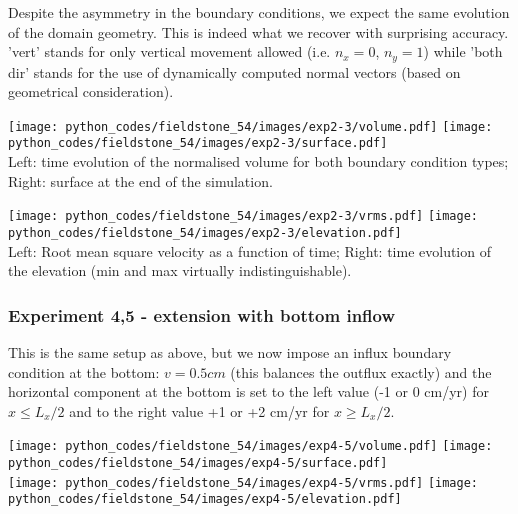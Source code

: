 Despite the asymmetry in the boundary conditions, we expect the same evolution of the domain geometry. This is indeed what we recover with surprising accuracy. 'vert' stands for only vertical movement allowed (i.e. $n_x=0$, 
$n_y=1$) while 'both dir' stands for the use of dynamically computed normal vectors (based on geometrical consideration).

\begin{center}
\texttt{[image: python\_codes/fieldstone\_54/images/exp2-3/volume.pdf]}
\texttt{[image: python\_codes/fieldstone\_54/images/exp2-3/surface.pdf]}\\
{\captionfont Left: time evolution of the normalised volume for both boundary condition types; Right: surface at the end of the simulation.}
\end{center}


\begin{center}
\texttt{[image: python\_codes/fieldstone\_54/images/exp2-3/vrms.pdf]}
\texttt{[image: python\_codes/fieldstone\_54/images/exp2-3/elevation.pdf]}\\
{\captionfont Left: Root mean square velocity as a function of time; Right: time evolution of the elevation (min and max virtually indistinguishable).} 
\end{center}


\subsubsection*{Experiment 4,5 - extension with bottom inflow}

This is the same setup as above, but we now impose an influx boundary condition at the bottom: $v=0.5cm$ (this balances the outflux exactly) and 
the horizontal component at the bottom is set to the left value (-1 or 0 cm/yr) for $x\leq L_x/2$ and to the right value +1 or +2 cm/yr for $x\geq L_x/2$.

\begin{center}
\texttt{[image: python\_codes/fieldstone\_54/images/exp4-5/volume.pdf]}
\texttt{[image: python\_codes/fieldstone\_54/images/exp4-5/surface.pdf]}\\
\texttt{[image: python\_codes/fieldstone\_54/images/exp4-5/vrms.pdf]}
\texttt{[image: python\_codes/fieldstone\_54/images/exp4-5/elevation.pdf]}\\
\end{center}


